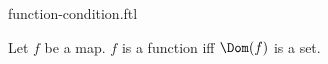 \documentclass{stex}
\begin{document}
\begin{smodule}{function-condition.ftl}


\begin{forthel}
  \begin{axiom}
    Let $f$ be a map.
    $f$ is a function iff $\Dom(f)$ is a set.
  \end{axiom}
\end{forthel}

\end{smodule}
\end{document}

